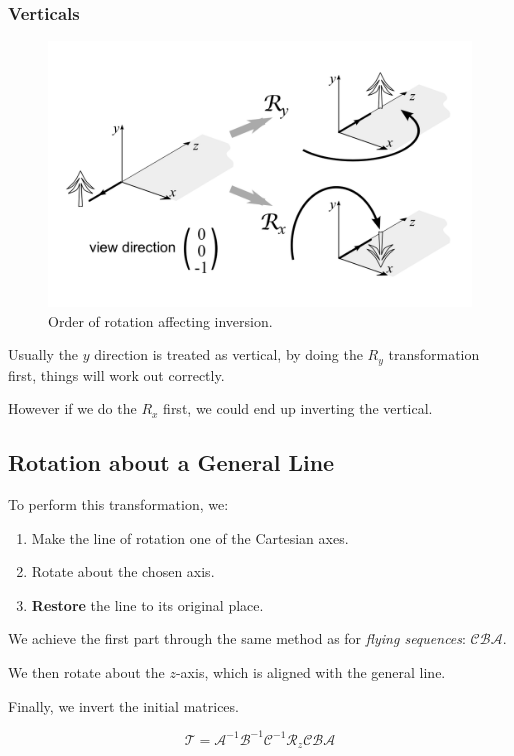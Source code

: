 \documentclass[11pt]{article}
\begin{document}
\subsubsection{Verticals}
\begin{figure}[htb!]
  \caption{Order of rotation affecting inversion.}
  \includegraphics[scale=0.2]{invert}
  \centering
\end{figure}

Usually the $y$ direction is treated as vertical, by doing the $R_y$ transformation first, things will work out correctly.

However if we do the $R_x$ first, we could end up inverting the vertical.

\subsection{Rotation about a General Line}
To perform this transformation, we:
\begin{enumerate}
  \item Make the line of rotation one of the Cartesian axes.
  \item Rotate about the chosen axis.
  \item \textbf{Restore} the line to its original place.
\end{enumerate}

We achieve the first part through the same method as for \textit{flying sequences}: $\mathcal{CBA}$.

We then rotate about the $z$-axis, which is aligned with the general line.

Finally, we invert the initial matrices.

\[
  \mathcal{T} = \mathcal{A}^{-1} \mathcal{B}^{-1} \mathcal{C}^{-1} \mathcal{R}_z \mathcal{CBA}  
\]
\end{document}
